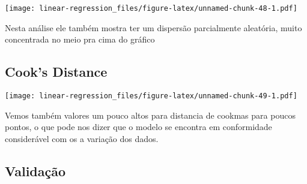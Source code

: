 \documentclass[]{article}
\newenvironment{Shaded}{\begin{snugshade}}{\end{snugshade}}
\newcommand{\KeywordTok}[1]{\textcolor[rgb]{0.13,0.29,0.53}{\textbf{#1}}}
\newcommand{\DataTypeTok}[1]{\textcolor[rgb]{0.13,0.29,0.53}{#1}}
\newcommand{\DecValTok}[1]{\textcolor[rgb]{0.00,0.00,0.81}{#1}}
\newcommand{\StringTok}[1]{\textcolor[rgb]{0.31,0.60,0.02}{#1}}
\newcommand{\OtherTok}[1]{\textcolor[rgb]{0.56,0.35,0.01}{#1}}
\newcommand{\OperatorTok}[1]{\textcolor[rgb]{0.81,0.36,0.00}{\textbf{#1}}}
\newcommand{\NormalTok}[1]{#1}
\begin{document}
\texttt{[image: linear-regression\_files/figure-latex/unnamed-chunk-48-1.pdf]}

Nesta análise ele também mostra ter um dispersão parcialmente aleatória,
muito concentrada no meio pra cima do gráfico

\subsection{Cook's Distance}\label{cooks-distance-3}

\begin{Shaded}
\end{Shaded}

\texttt{[image: linear-regression\_files/figure-latex/unnamed-chunk-49-1.pdf]}

Vemos também valores um pouco altos para distancia de cookmas para
poucos pontos, o que pode nos dizer que o modelo se encontra em
conformidade considerável com os a variação dos dados.

\subsection{Validação}\label{validacao}
\end{document}
